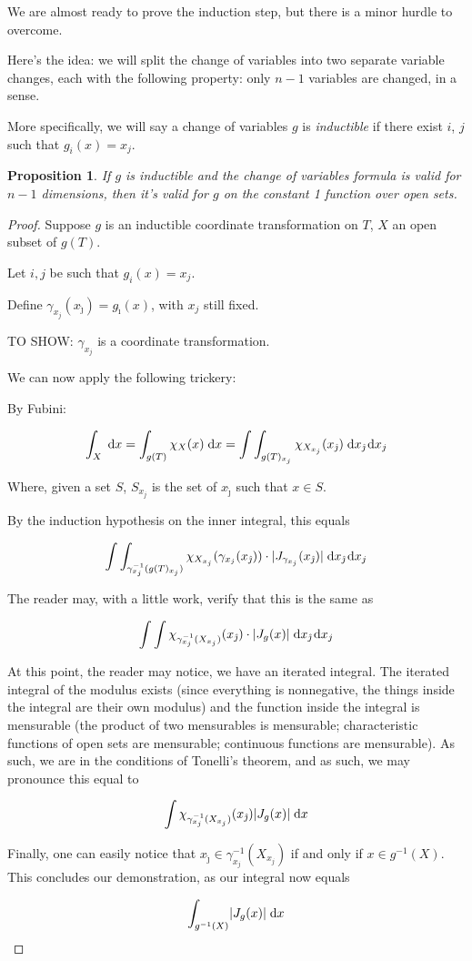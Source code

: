 \documentclass[11pt]{article}
\theoremstyle{definition}
\theoremstyle{plain}
\newtheorem{prop}{Proposition}
\newcommand{\mo}{^{-1}}
\begin{document}
We are almost ready to prove the induction step, but there is a minor hurdle to overcome.

Here's the idea: we will split the change of variables into two separate variable changes, each with the following property: only $n-1$ variables are changed, in a sense. %

More specifically, we will say a change of variables $g$ is \emph{inductible} if there exist $i$, $j$ such that $g_i(x) = x_j$.

\begin{prop}
If $g$ is inductible and the change of variables formula is valid for $n-1$ dimensions, then it's valid for $g$ on the constant 1 function over open sets.
\end{prop}

\begin{proof}
Suppose $g$ is an inductible coordinate transformation on $T$, $X$ an open subset of $g(T)$.

Let $i, j$ be such that $g_i(x) = x_j$.

Define $\gamma_{x_j}(x_{\hat\jmath}) = g_{\hat\imath}(x)$, with $x_j$ still fixed.

TO SHOW: $\gamma_{x_j}$ is a coordinate transformation.

We can now apply the following trickery:

By Fubini:

\[\int_X \d x = \int_{g(T)} \chi_X(x) \d x = \int \int_{g(T)_{x_j}} \chi_{X_{x_j}}(x_{\hat\jmath}) \d{x_{\hat\jmath}} \d{x_j}\]

Where, given a set $S$, $S_{x_j}$ is the set of $x_{\hat\jmath}$ such that $x \in S$.

By the induction hypothesis on the inner integral, this equals

\[ \int \int_{\gamma_{x_j}\mo(g(T)_{x_j})} \chi_{X_{x_j}}(\gamma_{x_j}(x_{\hat\jmath})) \cdot \lvert J_{\gamma_{x_j}}(x_{\hat\jmath}) \rvert \d{x_{\hat\jmath}} \d{x_j} \]

The reader may, with a little work, verify that this is the same as

\[ \int \int \chi_{\gamma_{x_j}\mo(X_{x_j})}(x_{\hat\jmath}) \cdot \lvert J_g(x) \rvert \d{x_{\hat\jmath}} \d{x_j}  \]

At this point, the reader may notice, we have an iterated integral. The iterated integral of the modulus exists (since everything is nonnegative, the things inside the integral are their own modulus) and the function inside the integral is mensurable (the product of two mensurables is mensurable; characteristic functions of open sets are mensurable; continuous functions are mensurable). As such, we are in the conditions of Tonelli's theorem, and as such, we may pronounce this equal to

\[ \int \chi_{\gamma_{x_j}\mo(X_{x_j})}(x_{\hat\jmath}) \lvert J_g(x) \rvert \d{x} \]

Finally, one can easily notice that $x_{\hat\jmath} \in \gamma_{x_j}\mo(X_{x_j})$ if and only if ${x \in g\mo(X)}$. This concludes our demonstration, as our integral now equals

\[ \int_{g\mo(X)} \lvert J_g(x) \rvert \d{x} \]
\end{proof}
\end{document}
